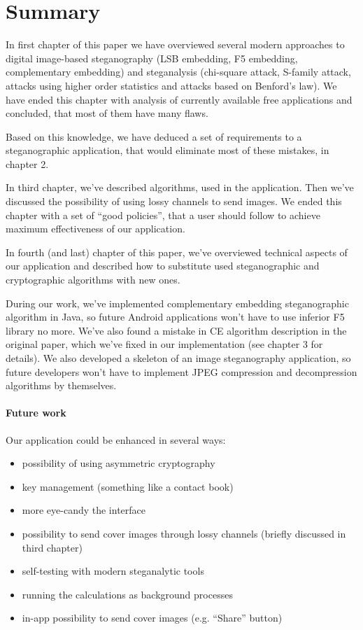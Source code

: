 \chapter*{Summary}

In first chapter of this paper we have overviewed several
modern approaches to digital image-based steganography (LSB embedding, F5 embedding, complementary embedding)
and steganalysis (chi-square attack, S-family attack, attacks using higher order statistics
and attacks based on Benford's law). We have  ended this chapter with analysis of currently available
free applications and concluded, that most of them have many flaws.

Based on this knowledge, we have deduced a set of requirements to a steganographic application, 
that would eliminate most of these mistakes, in chapter 2.

In third chapter, we've described algorithms, used in the application. Then we've discussed
the possibility of using lossy channels to send images. We ended this chapter with a set of
``good policies'', that a user should follow to achieve maximum effectiveness of our application.

In fourth (and last) chapter of this paper, we've overviewed technical aspects of our application and 
described how to substitute used steganographic and cryptographic algorithms with new ones.

During our work, we've implemented complementary embedding steganographic algorithm in Java,
so future Android applications won't have to use inferior F5 library no more. We've also found a mistake in CE algorithm
description in the original paper, which we've fixed in our implementation (see chapter 3 for details).
We also developed a skeleton of an image steganography application, so future developers won't have to
implement JPEG compression and decompression algorithms by themselves.

\subsubsection{Future work}
Our application could be enhanced in several ways:
\begin{itemize}
  \item possibility of using asymmetric cryptography
  \item key management (something like a contact book)
  \item more eye-candy the interface
  \item possibility to send cover images through lossy channels (briefly discussed in third chapter)
  \item self-testing with modern steganalytic tools
  \item running the calculations as background processes
  \item in-app possibility to send cover images (e.g. ``Share'' button)
\end{itemize}



\TODO
